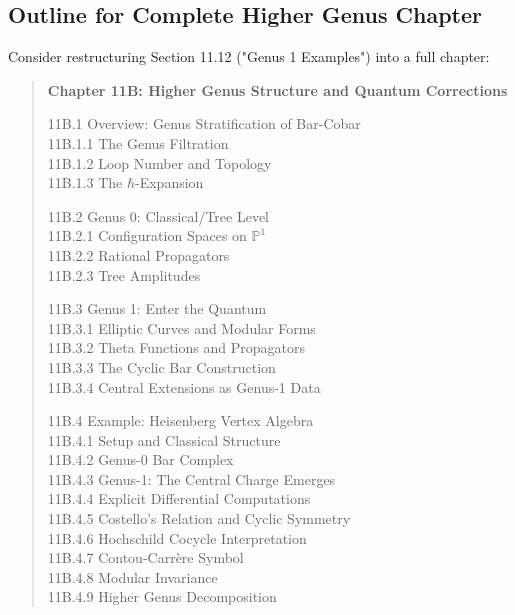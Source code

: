 \subsection{Outline for Complete Higher Genus Chapter}

Consider restructuring Section 11.12 ("Genus 1 Examples") into a full chapter:

\begin{quote}
\textbf{Chapter 11B: Higher Genus Structure and Quantum Corrections}

11B.1 Overview: Genus Stratification of Bar-Cobar \\
\phantom{11B.1} 11B.1.1 The Genus Filtration \\
\phantom{11B.1} 11B.1.2 Loop Number and Topology \\
\phantom{11B.1} 11B.1.3 The $\hbar$-Expansion

11B.2 Genus 0: Classical/Tree Level \\
\phantom{11B.2} 11B.2.1 Configuration Spaces on $\mathbb{P}^1$ \\
\phantom{11B.2} 11B.2.2 Rational Propagators \\
\phantom{11B.2} 11B.2.3 Tree Amplitudes

11B.3 Genus 1: Enter the Quantum \\
\phantom{11B.3} 11B.3.1 Elliptic Curves and Modular Forms \\
\phantom{11B.3} 11B.3.2 Theta Functions and Propagators \\
\phantom{11B.3} 11B.3.3 The Cyclic Bar Construction \\
\phantom{11B.3} 11B.3.4 Central Extensions as Genus-1 Data

11B.4 Example: Heisenberg Vertex Algebra \\
\phantom{11B.4} 11B.4.1 Setup and Classical Structure \\
\phantom{11B.4} 11B.4.2 Genus-0 Bar Complex \\
\phantom{11B.4} 11B.4.3 Genus-1: The Central Charge Emerges \\
\phantom{11B.4} 11B.4.4 Explicit Differential Computations \\
\phantom{11B.4} 11B.4.5 Costello's Relation and Cyclic Symmetry \\
\phantom{11B.4} 11B.4.6 Hochschild Cocycle Interpretation \\
\phantom{11B.4} 11B.4.7 Contou-Carrère Symbol \\
\phantom{11B.4} 11B.4.8 Modular Invariance \\
\phantom{11B.4} 11B.4.9 Higher Genus Decomposition


\end{quote}
